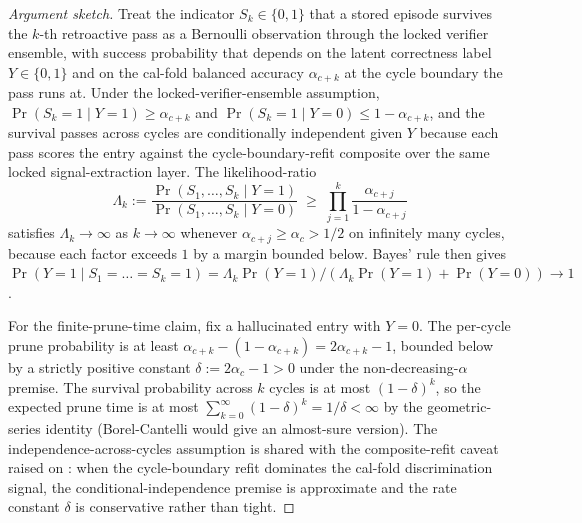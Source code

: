 \begin{proof}[Argument sketch]
Treat the indicator $S_k \in \{0,1\}$ that a stored episode survives the $k$-th retroactive pass as a Bernoulli observation through the locked verifier ensemble, with success probability that depends on the latent correctness label $Y \in \{0,1\}$ and on the cal-fold balanced accuracy $\alpha_{c+k}$ at the cycle boundary the pass runs at. Under the locked-verifier-ensemble assumption, $\Pr(S_k=1 \mid Y=1) \ge \alpha_{c+k}$ and $\Pr(S_k=1 \mid Y=0) \le 1-\alpha_{c+k}$, and the survival passes across cycles are conditionally independent given $Y$ because each pass scores the entry against the cycle-boundary-refit composite over the same locked signal-extraction layer. The likelihood-ratio
\[
\Lambda_k := \frac{\Pr(S_1, \dots, S_k \mid Y=1)}{\Pr(S_1, \dots, S_k \mid Y=0)} \;\ge\; \prod_{j=1}^{k} \frac{\alpha_{c+j}}{1 - \alpha_{c+j}}
\]
satisfies $\Lambda_k \to \infty$ as $k \to \infty$ whenever $\alpha_{c+j} \ge \alpha_c > 1/2$ on infinitely many cycles, because each factor exceeds $1$ by a margin bounded below. Bayes' rule then gives $\Pr(Y=1 \mid S_1=\dots=S_k=1) = \Lambda_k \Pr(Y=1) / (\Lambda_k \Pr(Y=1) + \Pr(Y=0)) \to 1$.

For the finite-prune-time claim, fix a hallucinated entry with $Y=0$. The per-cycle prune probability is at least $\alpha_{c+k} - (1-\alpha_{c+k}) = 2\alpha_{c+k} - 1$, bounded below by a strictly positive constant $\delta := 2\alpha_c - 1 > 0$ under the non-decreasing-$\alpha$ premise. The survival probability across $k$ cycles is at most $(1-\delta)^k$, so the expected prune time is at most $\sum_{k=0}^{\infty} (1-\delta)^k = 1/\delta < \infty$ by the geometric-series identity (Borel-Cantelli would give an almost-sure version). The independence-across-cycles assumption is shared with the composite-refit caveat raised on : when the cycle-boundary refit dominates the cal-fold discrimination signal, the conditional-independence premise is approximate and the rate constant $\delta$ is conservative rather than tight.
\end{proof}

